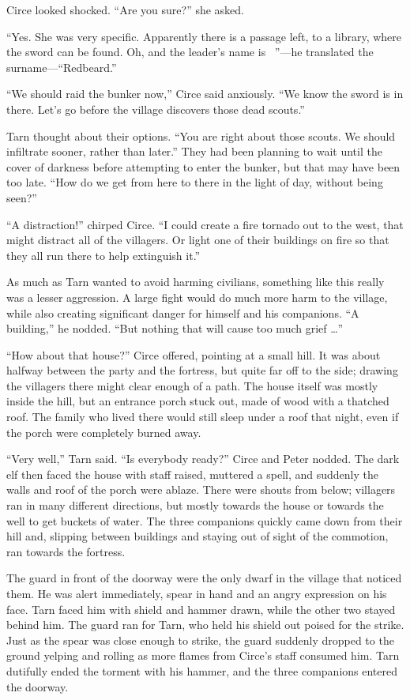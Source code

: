 Circe looked shocked.  ``Are you sure?'' she asked.

``Yes.  She was very specific.  Apparently there is a passage left, to a library, where the sword can be found.  Oh, and the leader's name is \mothzam\ \driktur''---he translated the surname---``Redbeard.''

``We should raid the bunker now,'' Circe said anxiously.  ``We know the sword is in there.  Let's go before the village discovers those dead scouts.''

Tarn thought about their options.  ``You are right about those scouts.  We should infiltrate sooner, rather than later.''  They had been planning to wait until the cover of darkness before attempting to enter the bunker, but that may have been too late.  ``How do we get from here to there in the light of day, without being seen?''

``A distraction!'' chirped Circe.  ``I could create a fire tornado out to the west, that might distract all of the villagers.  Or light one of their buildings on fire so that they all run there to help extinguish it.''

As much as Tarn wanted to avoid harming civilians, something like this really was a lesser aggression.  A large fight would do much more harm to the village, while also creating significant danger for himself and his companions.  ``A building,'' he nodded.  ``But nothing that will cause too much grief \ldots''

``How about that house?'' Circe offered, pointing at a small hill.  It was about halfway between the party and the fortress, but quite far off to the side; drawing the villagers there might clear enough of a path.  The house itself was mostly inside the hill, but an entrance porch stuck out, made of wood with a thatched roof.  The family who lived there would still sleep under a roof that night, even if the porch were completely burned away.

``Very well,'' Tarn said. ``Is everybody ready?''  Circe and Peter nodded.  The dark elf then faced the house with staff raised, muttered a spell, and suddenly the walls and roof of the porch were ablaze.  There were shouts from below; villagers ran in many different directions, but mostly towards the house or towards the well to get buckets of water.  The three companions quickly came down from their hill and, slipping between buildings and staying out of sight of the commotion, ran towards the fortress.

The guard in front of the doorway were the only dwarf in the village that noticed them.  He was alert immediately, spear in hand and an angry expression on his face.  Tarn faced him with shield and hammer drawn, while the other two stayed behind him.  The guard ran for Tarn, who held his shield out poised for the strike.  Just as the spear was close enough to strike, the guard suddenly dropped to the ground yelping and rolling as more flames from Circe's staff consumed him.  Tarn dutifully ended the torment with his hammer, and the three companions entered the doorway.